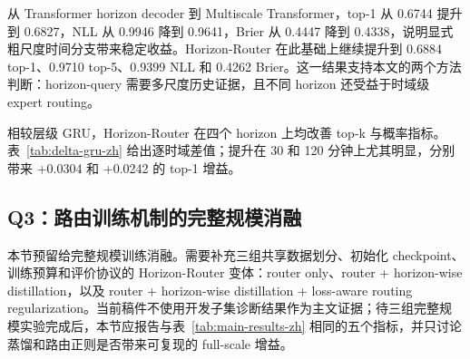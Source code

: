 从 Transformer horizon decoder 到 Multiscale Transformer，top-1 从 0.6744 提升到 0.6827，NLL 从 0.9946 降到 0.9641，Brier 从 0.4447 降到 0.4338，说明显式粗尺度时间分支带来稳定收益。Horizon-Router 在此基础上继续提升到 0.6884 top-1、0.9710 top-5、0.9399 NLL 和 0.4262 Brier。这一结果支持本文的两个方法判断：horizon-query 需要多尺度历史证据，且不同 horizon 还受益于时域级 expert routing。

相较层级 GRU，Horizon-Router 在四个 horizon 上均改善 top-k 与概率指标。表~\ref{tab:delta-gru-zh} 给出逐时域差值；提升在 30 和 120 分钟上尤其明显，分别带来 +0.0304 和 +0.0242 的 top-1 增益。

\begin{table}[!t]
\centering
\small
\resizebox{\textwidth}{!}{%

}
\caption{Horizon-Router 相较层级 GRU 基线的逐时域差值。对于 top-k，正值更好；对于 NLL、Brier 和 ECE，负值更好。}
\label{tab:delta-gru-zh}
\end{table}

\subsection{Q3：路由训练机制的完整规模消融}

本节预留给完整规模训练消融。需要补充三组共享数据划分、初始化 checkpoint、训练预算和评价协议的 Horizon-Router 变体：router only、router + horizon-wise distillation，以及 router + horizon-wise distillation + loss-aware routing regularization。当前稿件不使用开发子集诊断结果作为主文证据；待三组完整规模实验完成后，本节应报告与表~\ref{tab:main-results-zh} 相同的五个指标，并只讨论蒸馏和路由正则是否带来可复现的 full-scale 增益。
